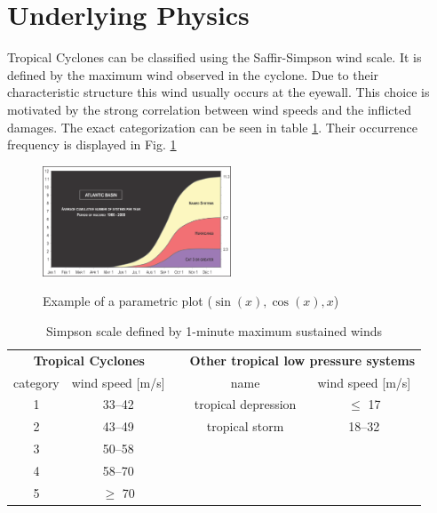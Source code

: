 \section{Underlying Physics}\label{sec:physics}
Tropical Cyclones can be classified using the Saffir-Simpson wind scale. It is defined by the maximum wind observed in the cyclone. Due to their characteristic structure this wind usually occurs at the eyewall. This choice is motivated by the strong correlation between wind speeds and the inflicted damages.\cite{simpson} The exact categorization can be seen in table \ref{tab:simpson-scale}.
Their occurrence frequency is displayed in Fig. \ref{fig:cat-climatology} 
\begin{figure}[h]
\caption{Example of a parametric plot ($\sin (x), \cos(x), x$)}
\centering
\includegraphics[width=0.5\textwidth]{img/cum-average-cat.png}
\label{fig:cat-climatology}
\end{figure}

\begingroup
\setlength{\tabcolsep}{10pt} %
\renewcommand{\arraystretch}{1.5} %
\begin{table}[hbt!]
\centering
\begin{tabular}{|c|c|c|c|c|}
\cline{1-2} \cline{4-5}
\multicolumn{2}{|c|}{\textbf{Tropical Cyclones}} &  & \multicolumn{2}{c|}{\textbf{Other tropical low pressure systems}} \\ \cline{1-2} \cline{4-5} 
category     & wind speed {[}m/s{]}     &  & name                & wind speed {[}m/s{]}               \\ \cline{1-2} \cline{4-5} 
1 & 33--42    &  & tropical depression & $\leq$ 17 \\
2 & 43--49    &  & tropical storm      & 18--32    \\
3 & 50--58    &  &                     &           \\
4 & 58--70    &  &                     &           \\
5 & $\geq$ 70 &  &                     &           \\ \cline{1-2} \cline{4-5} 
\end{tabular}
\caption{Simpson scale defined by 1-minute maximum sustained winds}
\label{tab:simpson-scale}
\end{table}
\endgroup

